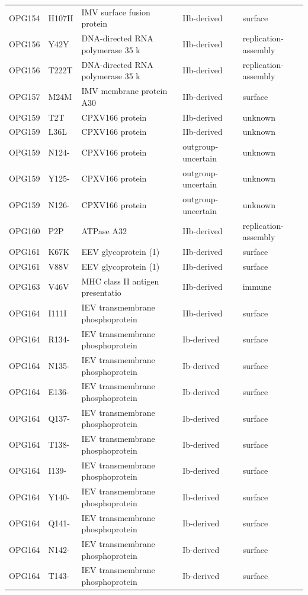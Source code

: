 \documentclass[11pt]{article}
\begin{document}
\begin{longtable}{lllll}
OPG154 & H107H & IMV surface fusion protein & IIb-derived & surface \\
OPG156 & Y42Y & DNA-directed RNA polymerase 35 k & IIb-derived & replication-assembly \\
OPG156 & T222T & DNA-directed RNA polymerase 35 k & IIb-derived & replication-assembly \\
OPG157 & M24M & IMV membrane protein A30 & IIb-derived & surface \\
OPG159 & T2T & CPXV166 protein & IIb-derived & unknown \\
OPG159 & L36L & CPXV166 protein & IIb-derived & unknown \\
OPG159 & N124- & CPXV166 protein & outgroup-uncertain & unknown \\
OPG159 & Y125- & CPXV166 protein & outgroup-uncertain & unknown \\
OPG159 & N126- & CPXV166 protein & outgroup-uncertain & unknown \\
OPG160 & P2P & ATPase A32 & IIb-derived & replication-assembly \\
OPG161 & K67K & EEV glycoprotein (1) & IIb-derived & surface \\
OPG161 & V88V & EEV glycoprotein (1) & IIb-derived & surface \\
OPG163 & V46V & MHC class II antigen presentatio & IIb-derived & immune \\
OPG164 & I111I & IEV transmembrane phosphoprotein & IIb-derived & surface \\
OPG164 & R134- & IEV transmembrane phosphoprotein & Ib-derived & surface \\
OPG164 & N135- & IEV transmembrane phosphoprotein & Ib-derived & surface \\
OPG164 & E136- & IEV transmembrane phosphoprotein & Ib-derived & surface \\
OPG164 & Q137- & IEV transmembrane phosphoprotein & Ib-derived & surface \\
OPG164 & T138- & IEV transmembrane phosphoprotein & Ib-derived & surface \\
OPG164 & I139- & IEV transmembrane phosphoprotein & Ib-derived & surface \\
OPG164 & Y140- & IEV transmembrane phosphoprotein & Ib-derived & surface \\
OPG164 & Q141- & IEV transmembrane phosphoprotein & Ib-derived & surface \\
OPG164 & N142- & IEV transmembrane phosphoprotein & Ib-derived & surface \\
OPG164 & T143- & IEV transmembrane phosphoprotein & Ib-derived & surface \\

\end{longtable}
\end{document}
